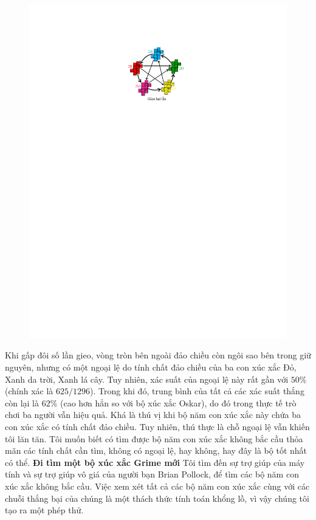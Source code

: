 \begin{multicols}{2}
\begin{figure}[H]
		\includegraphics[scale =1]{12}
		\vspace*{-10pt}
	\end{figure}
	Khi gấp đôi số lần gieo, vòng tròn bên ngoài đảo chiều còn ngôi sao bên trong giữ nguyên, nhưng có một ngoại lệ do tính chất đảo chiều của ba con xúc xắc Đỏ, Xanh da trời, Xanh lá cây.
	\vskip 0.05cm
	Tuy nhiên, xác suất của ngoại lệ này rất gần với $50\%$ (chính xác là $625/1296$). Trong khi đó, trung bình của tất cả các xác suất thắng còn lại là $62\%$ (cao hơn hẳn so với bộ xúc xắc Oskar), do đó trong thực tế trò chơi ba người vẫn hiệu quả.
	\vskip 0.05cm
	Khá là thú vị khi bộ năm con xúc xắc này chứa ba con xúc xắc có tính chất đảo chiều. Tuy nhiên, thú thực là chỗ ngoại lệ vẫn khiến tôi lăn tăn. Tôi muốn biết có tìm được bộ năm con xúc xắc không bắc cầu thỏa mãn các tính chất cần tìm, không có ngoại lệ, hay không, hay đây là bộ tốt nhất có thể.
	\vskip 0.1cm
	\textbf{\color{quantoan}Đi tìm một bộ xúc xắc Grime mới}
	\vskip 0.1cm
	Tôi tìm đến sự trợ giúp của máy tính và sự trợ giúp vô giá của người bạn Brian Pollock, để tìm các bộ năm con xúc xắc không bắc cầu. Việc xem xét tất cả các bộ năm con xúc xắc cùng với các chuỗi thắng bại của chúng là một thách thức tính toán khổng lồ, vì vậy chúng tôi tạo ra một phép thử.

\end{multicols}
